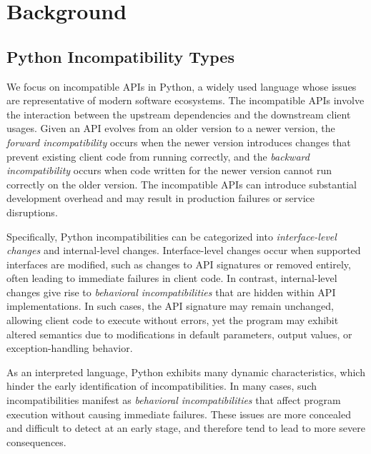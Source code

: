 
\section{Background}


\subsection{Python Incompatibility Types}\label{sec:back:1}


We focus on incompatible APIs in Python, a widely used language whose issues are representative of modern software ecosystems. The incompatible APIs involve the interaction between the upstream dependencies and the downstream client usages. Given an API evolves from an older version to a newer version, the \textit{forward incompatibility} occurs when the newer version introduces changes that prevent existing client code from running correctly, and the \textit{backward incompatibility} occurs when code written for the newer version cannot run correctly on the older version. The incompatible APIs can introduce substantial development overhead and may result in production failures or service disruptions.


Specifically, Python incompatibilities can be categorized into \textit{interface-level changes} and internal-level changes. Interface-level changes occur when supported interfaces are modified, such as changes to API signatures or removed entirely, often leading to immediate failures in client code. In contrast, internal-level changes give rise to \textit{behavioral incompatibilities} that are hidden within API implementations. In such cases, the API signature may remain unchanged, allowing client code to execute without errors, yet the program may exhibit altered semantics due to modifications in default parameters, output values, or exception-handling behavior.

As an interpreted language, Python exhibits many dynamic characteristics, which hinder the early identification of incompatibilities. In many cases, such incompatibilities manifest as \textit{behavioral incompatibilities} that affect program execution without causing immediate failures. These issues are more concealed and difficult to detect at an early stage, and therefore tend to lead to more severe consequences.


